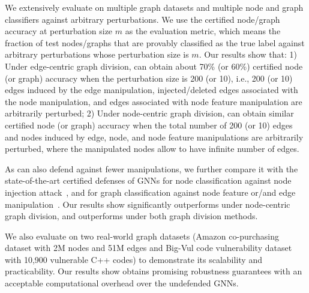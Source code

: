  We extensively evaluate {\name} on multiple graph datasets and multiple node and graph classifiers against arbitrary perturbations. 
We use the certified node/graph  accuracy at perturbation size $m$ 
as the evaluation metric, which means the fraction of test nodes/graphs that are provably classified as the true label against arbitrary perturbations whose perturbation size is $m$. 
Our results show that: 1) Under edge-centric graph division, {\name} can obtain about 70\% (or 60\%) certified node (or graph) accuracy when 
the perturbation size is 200 (or 10), i.e., 200 (or 10) edges induced by the edge manipulation, injected/deleted edges associated with the node manipulation, and edges associated with node feature manipulation are arbitrarily perturbed; 2) Under node-centric graph division, {\name} can obtain similar 
certified node (or graph) accuracy when the total number of 200 (or 10) edges and nodes induced by edge, node, and node feature manipulations are arbitrarily perturbed, where the manipulated nodes allow to have infinite number of edges. 

As {\name} can also defend against fewer manipulations, 
we further compare it with the state-of-the-art certified defenses of GNNs for node classification against node injection attack~\cite{lai2023nodeawarebismoothingcertifiedrobustness}, and for graph classification against node feature or/and edge manipulation~\cite{xia2024gnncert}. 
Our results show {\name} significantly outperforms \cite{lai2023nodeawarebismoothingcertifiedrobustness}  under node-centric graph division, and outperforms \cite{xia2024gnncert} 
under both graph division methods. 

We also evaluate {\name} on two real-world graph datasets (Amazon co-purchasing dataset \cite{clusterGCN} with 2M nodes and 51M edges and Big-Vul code vulnerability dataset \cite{big_vul} with 10,900 vulnerable C++ codes) to demonstrate its scalability and practicability. Our results show {\name} obtains promising robustness guarantees with an acceptable computational overhead over the undefended GNNs.

